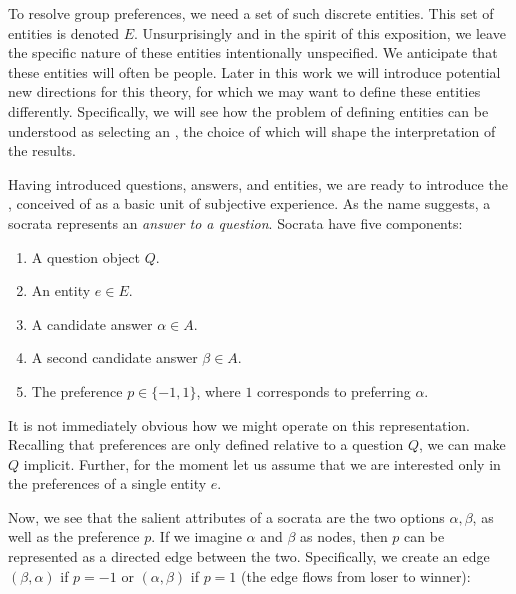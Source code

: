 \documentclass[12pt]{book}
\begin{document}
To resolve group preferences, we need a set of such discrete entities.
This set of entities is denoted $E$.
Unsurprisingly and in the spirit of this exposition, we leave the specific nature of these entities intentionally unspecified.
We anticipate that these entities will often be people. Later in this work we will introduce potential new directions for this theory, for which we may want to define these entities differently. Specifically, we will see how the problem of defining entities can be understood as selecting an , the choice of which will shape the interpretation of the results.

\bigskip

Having introduced questions, answers, and entities, we are ready to introduce the , conceived of as a basic unit of subjective experience. As the name suggests, a socrata represents an \textit{answer to a question}. Socrata have five components:

\begin{enumerate}
	\item A question object $Q$.
	\item An entity $e \in E$.
	\item A candidate answer $\alpha \in A$.
	\item A second candidate answer $\beta \in A$.
	\item The preference $p \in \{-1, 1\}$, where $1$ corresponds to preferring $\alpha$.
\end{enumerate}

It is not immediately obvious how we might operate on this representation. Recalling that preferences are only defined relative to a question $Q$, we can make $Q$ implicit. Further, for the moment let us assume that we are interested only in the preferences of a single entity $e$.

Now, we see that the salient attributes of a socrata are the two options $\alpha, \beta$, as well as the preference $p$. If we imagine $\alpha$ and $\beta$ as nodes, then $p$ can be represented as a directed edge between the two. Specifically, we create an edge $(\beta, \alpha)$ if $p = -1$ or $(\alpha, \beta)$ if $p = 1$ (the edge flows from loser to winner):

\begin{center}
\end{center}
\end{document}
